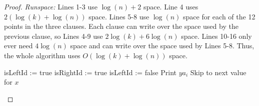 \documentclass[10pt,a4paper]{amsart}
\newcommand{\LOGSPACE}{\ensuremath\mathsf{L}}
\begin{document}
\begin{proof}
\emph{Runspace:} Lines 1-3 use $\log(n)+2$ space. Line 4 uses $2(\log(k)+\log(n))$ space. Lines 5-8 use $\log(n)$ space for each of the 12 points in the three clauses. Each clause can write over the space used by the previous clause, so Lines 4-9 use $2\log(k)+6\log(n)$ space. Lines 10-16 only ever need $4\log(n)$ space and can write over the space used by Lines 5-8. Thus, the whole algorithm uses $O(\log(k)+\log(n))$ space.
  \begin{algorithm}
  \caption{$\LOGSPACE$ algorithm for Enumerate Identities}
    \label{alg:identities}
    \begin{algorithmic}[1]
          \State isLeftId := true
          \State isRightId := true
                \State isLeftId := false
             \EndIf
          \EndFor
                    \State Print $ya_i$
                    \State Skip to next value for $x$
                \EndIf
            \EndFor
          \EndIf
      \EndFor
    \end{algorithmic}
  \end{algorithm}
  \fi
\end{proof}
\end{document}
